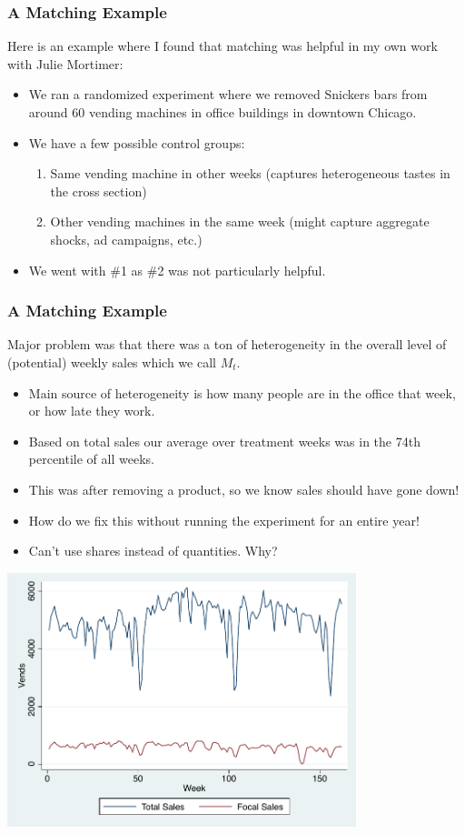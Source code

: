 \documentclass[xcolor=pdftex,dvipsnames,table,mathserif,aspectratio=169]{beamer}
\begin{document}
\begin{frame}
\frametitle{A Matching Example}
Here is an example where I found that matching was helpful in my own work with Julie Mortimer:
\begin{itemize}
\item We ran a randomized experiment where we removed Snickers bars from around 60 vending machines in office buildings in downtown Chicago.
\item We have a few possible control groups:
\begin{enumerate}
\item Same vending machine in other weeks (captures heterogeneous tastes in the cross section)
\item Other vending machines in the same week (might capture aggregate shocks, ad campaigns, etc.)
\end{enumerate}
\item We went with \#1 as \#2 was not particularly helpful.
\end{itemize}
\end{frame}

\begin{frame}
\frametitle{A Matching Example}
Major problem was that there was a ton of heterogeneity in the overall level of (potential) weekly sales which we call $M_t$.
\begin{itemize}
\item Main source of heterogeneity is how many people are in the office that week, or how late they work.
\item Based on total sales our average over treatment weeks was in the 74th percentile of all weeks.
\item This was after removing a product, so we know sales should have gone down!
\item How do we fix this without running the experiment for an entire year!
\item Can't use shares instead of quantities. Why?
\end{itemize}
\end{frame}

\begin{frame}
\begin{center}
\includegraphics[width=4in]{./resources/figure1.pdf}
\end{center}
\end{frame}
\end{document}
